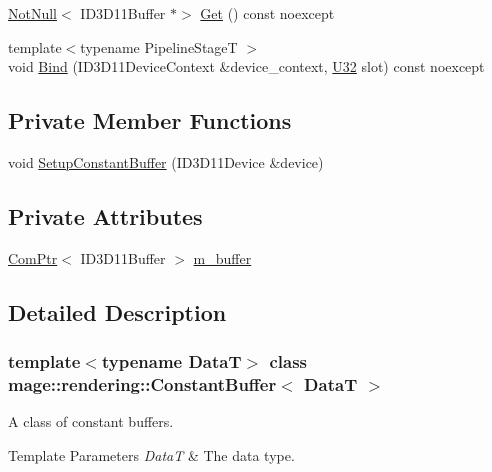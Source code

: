 \begin{DoxyCompactItemize}
\item 
\mbox{\hyperlink{namespacemage_a8769f9d670d6b585ea306cb1062af94b}{Not\+Null}}$<$ I\+D3\+D11\+Buffer $\ast$$>$ \mbox{\hyperlink{classmage_1_1rendering_1_1_constant_buffer_abdb0c7d40b2464db5b18b4e3d46adcd8}{Get}} () const noexcept
\item 
{\footnotesize template$<$typename Pipeline\+StageT $>$ }\\void \mbox{\hyperlink{classmage_1_1rendering_1_1_constant_buffer_a810344fa71c98ee900f717351587a2f3}{Bind}} (I\+D3\+D11\+Device\+Context \&device\+\_\+context, \mbox{\hyperlink{namespacemage_a41c104c036fba3756a74e19f793eeaa1}{U32}} slot) const noexcept
\end{DoxyCompactItemize}
\subsection*{Private Member Functions}
\begin{DoxyCompactItemize}
\item 
void \mbox{\hyperlink{classmage_1_1rendering_1_1_constant_buffer_a65ce186b87c489bd3bf4e9f7c47c5ac7}{Setup\+Constant\+Buffer}} (I\+D3\+D11\+Device \&device)
\end{DoxyCompactItemize}
\subsection*{Private Attributes}
\begin{DoxyCompactItemize}
\item 
\mbox{\hyperlink{namespacemage_ae74f374780900893caa5555d1031fd79}{Com\+Ptr}}$<$ I\+D3\+D11\+Buffer $>$ \mbox{\hyperlink{classmage_1_1rendering_1_1_constant_buffer_ae5b259b0afca9b20254735a09eccc1fc}{m\+\_\+buffer}}
\end{DoxyCompactItemize}


\subsection{Detailed Description}
\subsubsection*{template$<$typename DataT$>$\newline
class mage\+::rendering\+::\+Constant\+Buffer$<$ Data\+T $>$}

A class of constant buffers.


\begin{DoxyTemplParams}{Template Parameters}
{\em DataT} & The data type. \\
\hline
\end{DoxyTemplParams}


